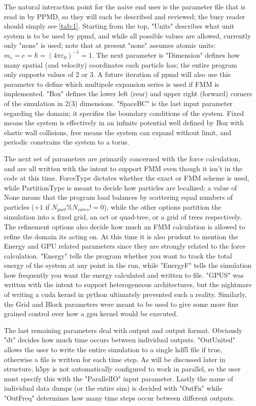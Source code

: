 \documentclass[%
 reprint,
 amsmath,amssymb,
 aps,
pra,
prb,
rmp,
prstab,
prstper,
]{revtex4-1}
\begin{document}
The natural interaction point for the naive end user is the parameter file that
is read in by PPMD, so they will each be described and reviewed; the busy reader should simply see \ref{tab:1}. Starting from the top, "Units" describes what unit system is
to be used by ppmd, and while all possible values are allowed, currently only
"none" is used; note that at present "none" assumes atomic units: 
$m_{e}=e=\hbar=(4\pi\varepsilon_{0})^{-1}=1$. The next parameter is "Dimension"
defines how many spatial (and velocity) coordinates each particle has; the entire
program only supports values of 2 or 3. A future iteration of ppmd will also use this 
parameter to define which multipole expansion series is used if FMM is implemented. 
"Box" defines the lower left (rear) and upper right (forward) corners of the simulation 
in 2(3) dimensions. "SpaceBC" is the last input parameter regarding the domain; it 
specifies the boundary conditions of the system. Fixed means the system is effectively
in an infinite potential well defined by Box with elastic wall collisions, free means
the system can expand without limit, and periodic constrains the system to a torus. 

The next set of parameters are primarily concerned with the force calculation, and are
all written with the intent to support FMM even though it isn't in the code at this
time. ForceType dictates whether the exact or FMM scheme is used, while PartitionType
is meant to decide how particles are localized; a value of None means that the program
load balances by scattering equal numbers of particles ($+ 1$ if 
$N_{part}\%N_{cores}!=0$), while the other options partition the simulation into a
fixed grid, an oct or quad-tree, or a grid of trees respectively. The refinement
options also decide how much an FMM calculation is allowed to refine the domain its
acting on. At this time it is also prudent to mention the Energy and GPU related 
parameters since they are strongly related to the force calculation. "Energy" tells
the program whether you want to track the total energy of the system at any point
in the run, while "EnergyF" tells the simulation how frequently you want the energy
calculated and written to file. "GPUS" was written with the intent to support 
heterogeneous architectures, but the nightmare of writing a cuda kernel in python
ultimately prevented such a reality. Similarly, the Grid and Block parameters were
meant to be used to give some more fine grained control over how a gpu kernel would
be executed.

The last remaining parameters deal with output and output format. Obviously "dt" decides
how much time occurs between individual outputs. "OutUnited" allows the user to
write the entire simulation to a single hdf5 file if true, otherwise a file is written
for each time step. As will be discussed later in structure, h5py is not automatically
configured to work in parallel, so the user must specify this with the "ParallelIO" 
input parameter. Lastly the name of individual data dumps (or the entire sim) is
decided with "OutFn" while "OutFreq" determines how many time steps occur between
different outputs. 
\end{document}
